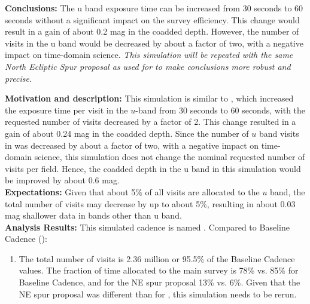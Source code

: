 {\bf Conclusions:} The u band exposure time can be increased from 30
seconds to 60 seconds without a significant impact on the survey
efficiency. This change would result in a gain of about 0.2 mag in the
coadded depth. However, the number of visits in the u band would be
decreased by about a factor of two, with a negative impact on
time-domain science.  {\it This simulation will be repeated with the
same North Ecliptic Spur proposal as used for 
to make conclusions more robust and precise.}



{\bf Motivation and description:} This simulation is similar to
, which increased the exposure time
per visit in the $u$-band from 30 seconds to 60 seconds, with the
requested number of visits decreased by a factor of 2. This change
resulted in a gain of about 0.24 mag in the coadded depth. Since the
number of $u$ band visits in  was
decreased by about a factor of two, with a negative impact on
time-domain science, this simulation does not change the nominal
requested number of visits per field. Hence, the coadded depth in the
u band in this simulation would be improved by about 0.6 mag. \\

{\bf Expectations:}  Given that about 5\% of all visits are allocated
to the $u$ band, the total number of visits may decrease by up to
about 5\%, resulting in about 0.03 mag shallower data in bands other
than u band. \\

{\bf Analysis Results:}  This simulated cadence is named
.  Compared to Baseline
Cadence ():
\begin{enumerate}
\item The total number of visits is 2.36 million or 95.5\% of the
Baseline Cadence values. The fraction of time allocated to the main
survey is 78\% vs. 85\% for Baseline Cadence, and for the NE spur
proposal 13\% vs. 6\%. Given that the NE spur proposal was different
than for , this simulation needs to be rerun.
\end{enumerate}


